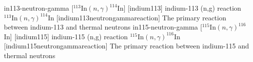 \newglsXreaction%
{in113-neutron-gamma}%
[{}$^{113}$In$(n,\gamma)^{114}$In]%
[indium113]%
{indium-113 (n,g) reaction}%
{{}$^{113}$In$(n,\gamma)^{114}$In}%
[indium113neutrongammareaction]%
{The primary reaction between indium-113 and thermal neutrons}%
\newglsXreaction%
{in115-neutron-gamma}%
[{}$^{115}$In$(n,\gamma)^{116}$In]%
[indium115]%
{indium-115 (n,g) reaction}%
{{}$^{115}$In$(n,\gamma)^{116}$In}%
[indium115neutrongammareaction]%
{The primary reaction between indium-115 and thermal neutrons}%
